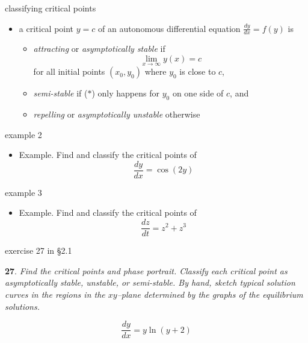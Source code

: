 \documentclass[colorlinks]{beamer}
\newcommand{\ds}{\displaystyle}
\begin{document}
\begin{frame}{classifying critical points}

\begin{itemize}
\item a critical point $y=c$ of an autonomous differential equation $\ds \frac{dy}{dx} = f(y)$ is
    \begin{itemize}
    \item \emph{attracting} or \emph{asymptotically stable} if
\begin{equation}
        \lim_{x \to \infty} y(x) = c   \tag{$\ast$}
\end{equation}
    for all initial points $(x_0,y_0)$ where $y_0$ is close to $c$,
    \item \emph{semi-stable} if ($\ast$) only happens for $y_0$ on one side of $c$, and
    \item \emph{repelling} or \emph{asymptotically unstable} otherwise
    \end{itemize}
\end{itemize}
\end{frame}


\begin{frame}{example 2}

\small
\begin{minipage}[t]{0.5\textwidth}
\begin{itemize}
\item Example. Find and classify the critical points of
   $$\frac{dy}{dx} = \cos(2y)$$

\vspace{40mm}
\end{itemize}
\end{minipage}
\end{frame}


\begin{frame}{example 3}

\small
\begin{minipage}[t]{0.5\textwidth}
\begin{itemize}
\item Example. Find and classify the critical points of
   $$\frac{dz}{dt} = z^2 + z^3$$

\vspace{40mm}
\end{itemize}
\end{minipage}
\end{frame}


\begin{frame}{exercise 27 in \S 2.1}

\small
\begin{minipage}[t]{0.45\textwidth}
\noindent \textbf{27}.  \emph{Find the critical points and phase portrait.  Classify each critical point as asymptotically stable, unstable, or semi-stable.  By hand, sketch typical solution curves in the regions in the $xy$--plane determined by the graphs of the equilibrium solutions.}

$$\frac{dy}{dx} = y \ln(y+2)$$
\end{minipage}

\vspace{20mm}
\end{frame}
\end{document}
